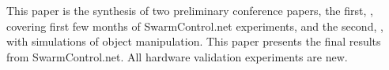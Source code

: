  This paper is the synthesis of two preliminary conference papers, the first, \cite{swarmcontrol2013}, covering first few months of SwarmControl.net experiments, and the second, \cite{ShahrokhiIROS2015}, with simulations of object manipulation.  This paper presents the final results from SwarmControl.net.  All hardware validation experiments are new.

